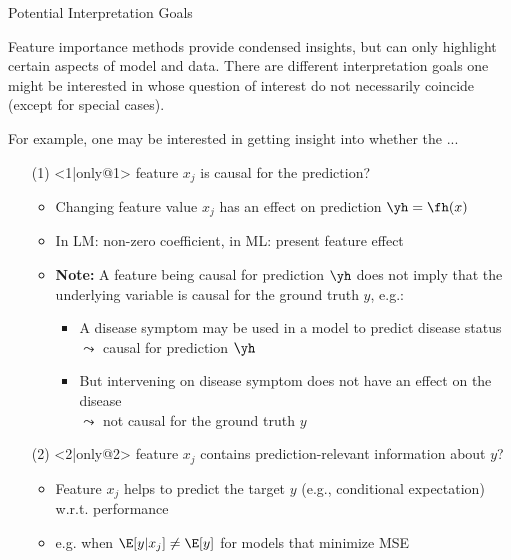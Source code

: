 \begin{frame}{Potential Interpretation Goals}

Feature importance methods provide condensed insights, but can only highlight certain aspects of model and data. There are different interpretation goals one might be interested in whose question of interest do not necessarily coincide (except for special cases).

\lz

For example, one may be interested in getting insight into whether the ...

\begin{enumerate}
    \item[(1)]<1|only@1> feature $x_j$ is causal for the prediction?
    \begin{itemize}
      \item Changing feature value $x_j$ has an effect on prediction $\yh = \fh(x)$
      \item In LM: non-zero coefficient, in ML: present feature effect
      \item \textbf{Note:} 
      A feature being causal for prediction $\yh$ does not imply that the underlying variable is causal for the ground truth $y$, e.g.:
      \begin{itemize}
          \item A disease symptom may be used in a model to predict disease status \\
          $\leadsto$ causal for prediction $\yh$
          \item But intervening on disease symptom does not have an effect on the disease \\
          $\leadsto$ not causal for the ground truth $y$
      \end{itemize}
    \end{itemize}
    \item[(2)]<2|only@2> feature $x_j$ contains prediction-relevant information about $y$?
    \begin{itemize}
      \item Feature $x_j$ helps to predict the target $y$ (e.g., conditional expectation) w.r.t. performance 
      \item e.g. when $\E[y|x_j] \neq \E[y]$ for models that minimize MSE

\end{itemize}
\end{enumerate}
\end{frame}
